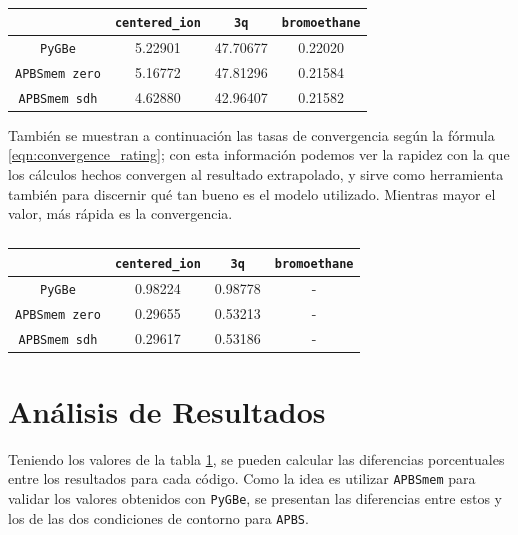 \documentclass[12pt, oneside, numbers, spanish]{ezthesis}
\numberwithin{equation}{section}
\begin{document}
\begin{table}[H]
	\centering
	\caption{}
	\def\arraystretch{0.8}
	\begin{tabular}{|c|ccc|}\hline
		 & \texttt{centered\_ion} & \texttt{3q} & \texttt{bromoethane} \\ \hline
		\texttt{PyGBe} & 5.22901 & 47.70677 & 0.22020 \\ \hline
		\texttt{APBSmem zero} & 5.16772 & 47.81296 & 0.21584 \\ \hline
		\texttt{APBSmem sdh} & 4.62880 & 42.96407 & 0.21582 \\ \hline
	\end{tabular}\label{table:Rich_extrapolation}
\end{table}

\noindent
También se muestran a continuación las tasas de convergencia según la fórmula \ref{eqn:convergence_rating}; con esta información podemos ver la rapidez con la que los cálculos hechos convergen al resultado extrapolado, y sirve como herramienta también para discernir qué tan bueno es el modelo utilizado. Mientras mayor el valor, más rápida es la convergencia.

\begin{table}[H]
	\centering
	\caption{}
	\def\arraystretch{0.8}
	\begin{tabular}{|c|ccc|}\hline
		& \texttt{centered\_ion} & \texttt{3q} & \texttt{bromoethane} \\ \hline
		\texttt{PyGBe} & 0.98224 & 0.98778 & - \\ \hline
		\texttt{APBSmem zero} & 0.29655 & 0.53213 & - \\ \hline
		\texttt{APBSmem sdh} & 0.29617 & 0.53186 & - \\ \hline
	\end{tabular}\label{table:Convergence_ratings}
\end{table}

\section{Análisis de Resultados}\label{Sec:analisis_resultados}

Teniendo los valores de la tabla \ref{table:Rich_extrapolation}, se pueden calcular las diferencias porcentuales entre los resultados para cada código. Como la idea es utilizar \texttt{APBSmem} para validar los valores obtenidos con \texttt{PyGBe}, se presentan las diferencias entre estos y los de las dos condiciones de contorno para \texttt{APBS}.
\end{document}

